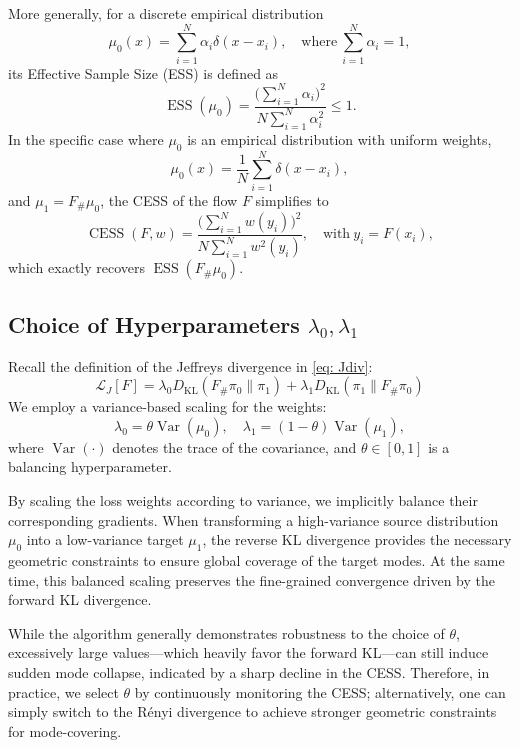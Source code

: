 \documentclass[%
 reprint,
 amsmath,amssymb,
 aps,
 pre,
]{revtex4-2}
\DeclareMathOperator{\KL}{KL}
\DeclareMathOperator{\Var}{Var}
\DeclareMathOperator{\ESS}{ESS}
\DeclareMathOperator{\CESS}{CESS}
\newcommand{\Le}{\leqslant}
\begin{document}
More generally, for a discrete empirical distribution
\begin{equation*}
	\mu_0(x) = \sum_{i=1}^N \alpha_i \delta(x-x_i),\quad 
	\text{where} ~
	\sum_{i=1}^N \alpha_i = 1,
\end{equation*}
its Effective Sample Size (ESS) is defined as
\begin{equation}
	\ESS(\mu_0) = \frac{\big(\sum_{i=1}^N \alpha_i\big)^2}{N\sum_{i=1}^N \alpha_i^2} \Le 1.
\end{equation}
In the specific case where $\mu_0$ is an empirical distribution with uniform weights,
\begin{equation*}
	\mu_0(x) = \frac{1}{N} \sum_{i=1}^N \delta(x-x_i),
\end{equation*}
and $\mu_1 = F_\# \mu_0$, the CESS of the flow $F$ simplifies to
\begin{equation*}
	\CESS(F,w) = \frac{\big(\sum_{i=1}^N w(y_i)\big)^2}{N\sum_{i=1}^N w^2(y_i)},\quad \text{with} ~ y_i = F(x_i),
\end{equation*}
which exactly recovers $\ESS(F_\# \mu_0)$.

\subsection{Choice of Hyperparameters \(\lambda_0, \lambda_1\)}

Recall the definition of the Jeffreys divergence in \eqref{eq: Jdiv}:
\begin{equation*}
	\mathcal L_J[F] = \lambda_0 D_{\KL}(F_\#\pi_0\|\pi_1) + \lambda_1 D_{\KL}(\pi_1\|F_\#\pi_0)
\end{equation*}
We employ a variance-based scaling for the weights:
\begin{equation}
	\lambda_0 = \theta \Var(\mu_0), \quad \lambda_1 = (1 - \theta) \Var(\mu_1),
	\label{eq: lambda 01}
\end{equation}
where $\Var(\cdot)$ denotes the trace of the covariance, and $\theta \in [0, 1]$ is a balancing hyperparameter.

By scaling the loss weights according to variance, we implicitly balance their corresponding gradients. When transforming a high-variance source distribution $\mu_0$ into a low-variance target $\mu_1$, the reverse KL divergence provides the necessary geometric constraints to ensure global coverage of the target modes. At the same time, this balanced scaling preserves the fine-grained convergence driven by the forward KL divergence.

While the algorithm generally demonstrates robustness to the choice of $\theta$, excessively large values---which heavily favor the forward KL---can still induce sudden mode collapse, indicated by a sharp decline in the CESS. Therefore, in practice, we select $\theta$ by continuously monitoring the CESS; alternatively, one can simply switch to the R\'enyi divergence to achieve stronger geometric constraints for mode-covering.
\end{document}
